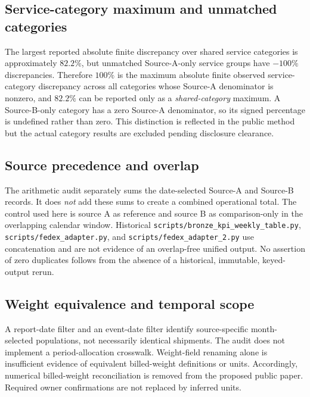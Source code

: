 \documentclass[11pt]{article}
\begin{document}
\subsection{Service-category maximum and unmatched categories}
The largest reported absolute finite discrepancy over shared service categories is approximately $82.2\%$, but unmatched Source-A-only service groups have $-100\%$ discrepancies. Therefore $100\%$ is the maximum absolute finite observed service-category discrepancy across all categories whose Source-A denominator is nonzero, and $82.2\%$ can be reported only as a \emph{shared-category} maximum. A Source-B-only category has a zero Source-A denominator, so its signed percentage is undefined rather than zero. This distinction is reflected in the public method but the actual category results are excluded pending disclosure clearance.

\subsection{Source precedence and overlap}
The arithmetic audit separately sums the date-selected Source-A and Source-B records. It does \emph{not} add these sums to create a combined operational total. The control used here is source A as reference and source B as comparison-only in the overlapping calendar window. Historical \texttt{scripts/bronze\_kpi\_weekly\_table.py}, \texttt{scripts/fedex\_adapter.py}, and \texttt{scripts/fedex\_adapter\_2.py} use concatenation and are not evidence of an overlap-free unified output. No assertion of zero duplicates follows from the absence of a historical, immutable, keyed-output rerun.

\subsection{Weight equivalence and temporal scope}
A report-date filter and an event-date filter identify source-specific month-selected populations, not necessarily identical shipments. The audit does not implement a period-allocation crosswalk. Weight-field renaming alone is insufficient evidence of equivalent billed-weight definitions or units. Accordingly, numerical billed-weight reconciliation is removed from the proposed public paper. Required owner confirmations are not replaced by inferred units.
\end{document}
